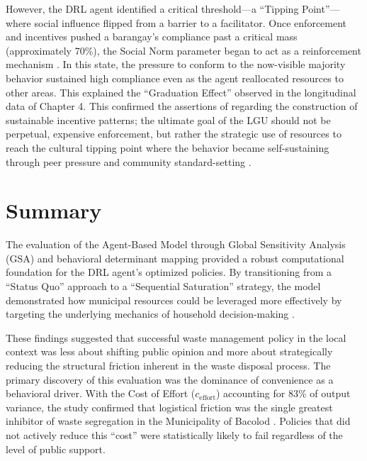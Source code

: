 However, the DRL agent identified a critical threshold—a ``Tipping Point''—where social influence flipped from a barrier to a facilitator. Once enforcement and incentives pushed a barangay’s compliance past a critical mass (approximately 70\%), the Social Norm parameter began to act as a reinforcement mechanism \citep{Centola2018}. In this state, the pressure to conform to the now-visible majority behavior sustained high compliance even as the agent reallocated resources to other areas. This explained the ``Graduation Effect'' observed in the longitudinal data of Chapter 4. This confirmed the assertions of \citet{Zheng2022} regarding the construction of sustainable incentive patterns; the ultimate goal of the LGU should not be perpetual, expensive enforcement, but rather the strategic use of resources to reach the cultural tipping point where the behavior became self-sustaining through peer pressure and community standard-setting \citep{Nishimura2022}.
\newpage

\section{Summary}
The evaluation of the Agent-Based Model through Global Sensitivity Analysis (GSA) and behavioral determinant mapping provided a robust computational foundation for the DRL agent's optimized policies. By transitioning from a ``Status Quo'' approach to a ``Sequential Saturation'' strategy, the model demonstrated how municipal resources could be leveraged more effectively by targeting the underlying mechanics of household decision-making \citep{ZhengAI2022}. 

These findings suggested that successful waste management policy in the local context was less about shifting public opinion and more about strategically reducing the structural friction inherent in the waste disposal process. The primary discovery of this evaluation was the dominance of convenience as a behavioral driver. With the Cost of Effort ($c_{\text{effort}}$) accounting for 83\% of output variance, the study confirmed that logistical friction was the single greatest inhibitor of waste segregation in the Municipality of Bacolod \citep{Yazawa2025}. Policies that did not actively reduce this ``cost'' were statistically likely to fail regardless of the level of public support.

